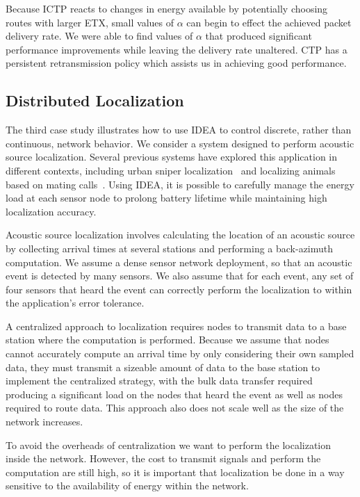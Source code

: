 Because ICTP reacts to changes in energy available by potentially choosing
routes with larger ETX, small values of $\alpha$ can begin to effect the
achieved packet delivery rate. We were able to find values of $\alpha$ that
produced significant performance improvements while leaving the delivery rate
unaltered. CTP has a persistent retransmission policy which assists us in
achieving good performance.

\subsection{Distributed Localization}

The third case study illustrates how to use IDEA to control discrete, rather
than continuous, network behavior. We consider a system designed to perform
acoustic source localization. Several previous systems have explored this
application in different contexts, including urban sniper
localization~\cite{shooter-localization} and localizing animals based on
mating calls~\cite{girod-marmots}. Using IDEA, it is possible to carefully
manage the energy load at each sensor node to prolong battery lifetime while
maintaining high localization accuracy.

Acoustic source localization involves calculating the location of an acoustic
source by collecting arrival times at several stations and performing a
back-azimuth computation. We assume a dense sensor network deployment, so
that an acoustic event is detected by many sensors. We also assume that for
each event, any set of four sensors that heard the event can correctly
perform the localization to within the application's error tolerance. 

A centralized approach to localization requires nodes to transmit data to a
base station where the computation is performed. Because we assume that nodes
cannot accurately compute an arrival time by only considering their own
sampled data, they must transmit a sizeable amount of data to the base
station to implement the centralized strategy, with the bulk data transfer
required producing a significant load on the nodes that heard the event as
well as nodes required to route data. This approach also does not scale well
as the size of the network increases.

To avoid the overheads of centralization we want to perform the localization
inside the network. However, the cost to transmit signals and perform the
computation are still high, so it is important that localization be done in a
way sensitive to the availability of energy within the network.

